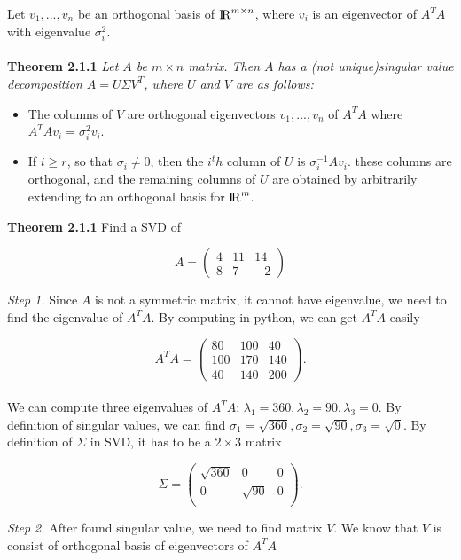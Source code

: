 \documentclass{article}
\begin{document}
Let 
$v_1,...,v_n$
be an orthogonal basis of
${\rm I\!R}^{m \times n}$,
where
$v_i$
is an eigenvector of 
$A^TA$
with eigenvalue
$\sigma^2_i$.
\\~\\
\textbf{Theorem 2.1.1}
\textit{Let $A$ be $m \times n$ matrix. Then $A$ has a (not unique)singular value decomposition $A = U \Sigma V^T$, where  $U$ and $V$ are as follows:}
\begin{itemize}
	\item The columns of $V$ are orthogonal eigenvectors $v_1, ... , v_n$ of $A^TA$ where $A^TAv_i= \sigma_i^2 v_i$.
	\item If $i \geq r$, so that $\sigma_i \not= 0$, then the $i^th$ column of $U$ is $\sigma_i^{-1} Av_i $. these columns are orthogonal, and the remaining columns of $U$ are obtained by arbitrarily extending to an orthogonal basis for ${\rm I\!R}^{m}.$
\end{itemize}
\textbf{Theorem 2.1.1} Find a SVD of 

\[A = 
	\begin{pmatrix}
		4 & 11 & 14 \\
		8 & 7 & -2 
	\end{pmatrix}\]
\vspace{1mm} 

\textit{Step 1.} Since $A$ is not a symmetric matrix, it cannot  have eigenvalue, we need to find the eigenvalue of $A^TA$. By computing in python, we can get $A^TA$ easily

\[A^TA= 
	\begin{pmatrix}
		80 & 100 & 40 \\
		100 & 170 & 140 \\
		40 & 140 & 200 
	\end{pmatrix}.\]
\\
We can compute three eigenvalues of $A^TA$: $\lambda_1 = 360, \lambda_2 = 90, \lambda_3 = 0$. By definition of singular values, we can find $\sigma_1 = \sqrt{360}, \sigma_2 = \sqrt{90}, \sigma_3 = \sqrt{0}$. By definition of $\Sigma$ in SVD, it has to be a $2 \times 3$ matrix

\[\Sigma= 
\begin{pmatrix}
	\sqrt{360} & 0 & 0 \\
	0 & \sqrt{90} & 0 \\
\end{pmatrix}.\]

\textit{Step 2.} After found singular value, we need to find matrix $V$. We know that $V$ is consist of orthogonal basis of eigenvectors of $A^TA$
\end{document}
